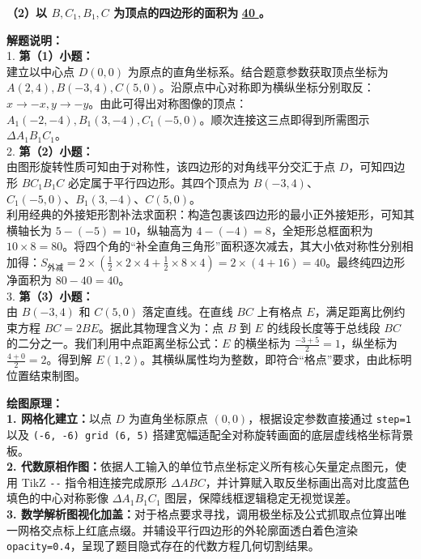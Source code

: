 \vspace{0.6cm}

\textbf{（2）以 $B, C_1, B_1, C$ 为顶点的四边形的面积为} \underline{\quad \textbf{40} \quad} \textbf{。}

\vspace{0.6cm}

{\small\color{gray}
\textbf{解题说明：}\\
1. \textbf{第（1）小题：}\\
建立以中心点 $D(0,0)$ 为原点的直角坐标系。结合题意参数获取顶点坐标为 $A(2,4), B(-3,4), C(5,0)$。沿原点中心对称即为横纵坐标分别取反：$x \rightarrow -x, y \rightarrow -y$。由此可得出对称图像的顶点：$A_1(-2,-4), B_1(3,-4), C_1(-5,0)$。顺次连接这三点即得到所需图示 $\Delta A_1B_1C_1$。\\
2. \textbf{第（2）小题：}\\
由图形旋转性质可知由于对称性，该四边形的对角线平分交汇于点 $D$，可知四边形 $BC_1B_1C$ 必定属于平行四边形。其四个顶点为 $B(-3,4)$、$C_1(-5,0)、B_1(3,-4)、C(5,0)$。\\
利用经典的外接矩形割补法求面积：构造包裹该四边形的最小正外接矩形，可知其横轴长为 $5 - (-5) = 10$，纵轴高为 $4 - (-4) = 8$，全矩形总框面积为 $10 \times 8 = 80$。将四个角的“补全直角三角形”面积逐次减去，其大小依对称性分别相加得：$S_\text{外减} = 2 \times (\frac{1}{2} \times 2 \times 4 + \frac{1}{2} \times 8 \times 4) = 2 \times (4 + 16) = 40$。最终纯四边形净面积为 $80 - 40 = 40$。\\
3. \textbf{第（3）小题：}\\
由 $B(-3,4)$ 和 $C(5,0)$ 落定直线。在直线 $BC$ 上有格点 $E$，满足距离比例约束方程 $BC=2BE$。据此其物理含义为：点 $B$ 到 $E$ 的线段长度等于总线段 $BC$ 的二分之一。我们利用中点距离坐标公式：$E$ 的横坐标为 $\frac{-3+5}{2} = 1$，纵坐标为 $\frac{4+0}{2}=2$。得到解 $E(1, 2)$。其横纵属性均为整数，即符合“格点”要求，由此标明位置结束制图。
}

\vspace{0.6cm}

{\small\color{blue!70!black}
\textbf{绘图原理：}\\
\textbf{1. 网格化建立：}以点 $D$ 为直角坐标原点 $(0,0)$，根据设定参数直接通过 \texttt{step=1} 以及 \texttt{(-6, -6) grid (6, 5)} 搭建宽幅适配全对称旋转画面的底层虚线格坐标背景板。\\
\textbf{2. 代数原相作图：}依据人工输入的单位节点坐标定义所有核心矢量定点图元，使用 TikZ \texttt{-{}-{}} 指令相连接完成原形 $\Delta ABC$，并计算赋入取反坐标画出高对比度蓝色填色的中心对称影像 $\Delta A_1B_1C_1$ 图层，保障线框逻辑稳定无视觉误差。\\
\textbf{3. 数学解析图视化加盖：}对于格点要求寻找，调用极坐标及公式抓取点位算出唯一网格交点标上红底点缀。并辅设平行四边形的外轮廓面透白着色渲染 \texttt{opacity=0.4}，呈现了题目隐式存在的代数方程几何切割结果。
}

